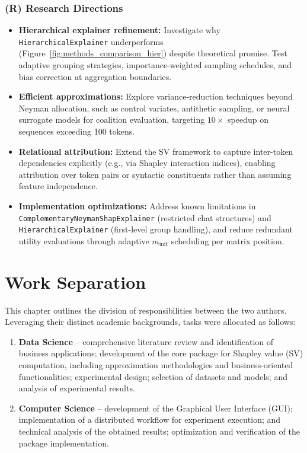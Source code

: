 \subsection*{(R) Research Directions}

\begin{itemize}
\item \textbf{Hierarchical explainer refinement:}
Investigate why \texttt{HierarchicalExplainer} underperforms (Figure~\ref{fig:methods_comparison_hier}) despite theoretical promise. Test adaptive grouping strategies, importance-weighted sampling schedules, and bias correction at aggregation boundaries.

\item \textbf{Efficient approximations:}
Explore variance-reduction techniques beyond Neyman allocation, such as control variates, antithetic sampling, or neural surrogate models for coalition evaluation, targeting $10\times$ speedup on sequences exceeding 100 tokens.

\item \textbf{Relational attribution:}
Extend the SV framework to capture inter-token dependencies explicitly (e.g., via Shapley interaction indices), enabling attribution over token pairs or syntactic constituents rather than assuming feature independence.

\item \textbf{Implementation optimizations:}
Address known limitations in \texttt{ComplementaryNeyman\allowbreak ShapExplainer} (restricted chat structures) and \texttt{HierarchicalExplainer} (first-level group handling), and reduce redundant utility evaluations through adaptive $m_{\text{init}}$ scheduling per matrix position.
\end{itemize}

\chapter*{Work Separation}
    \label{app:work_separation}

    This chapter outlines the division of responsibilities between the two authors. Leveraging their distinct academic backgrounds, tasks were allocated as follows:

    \begin{enumerate}
        \item \textbf{Data Science} – comprehensive literature review and identification of business applications; development of the core package for Shapley value (SV) computation, including approximation methodologies and business-oriented functionalities; experimental design; selection of datasets and models; and analysis of experimental results.
        \item \textbf{Computer Science} – development of the Graphical User Interface (GUI); implementation of a distributed workflow for experiment execution; and technical analysis of the obtained results; optimization and verification of the package implementation.
    \end{enumerate}

